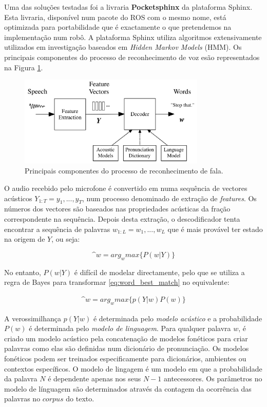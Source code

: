 \documentclass[journal]{IEEEtran}
\begin{document}
Uma das soluções testadas foi a livraria \textbf{Pocketsphinx} da plataforma Sphinx. Esta livraria, disponível num pacote do ROS com o mesmo nome, está optimizada para portabilidade que é exactamente o que pretendemos na implementação num robô. A plataforma Sphinx utiliza algoritmos extensivamente utilizados em investigação baseados em \textit{Hidden Markov Models} (HMM). Os principais componentes do processo de reconhecimento de voz esão representados na Figura \ref{fig:voicerecprocess}.

\begin{figure}[ht]
  \centering
  \includegraphics[width=21pc]{voice_rec_process.png}
  \caption{Principais componentes do processo de reconhecimento de fala.}
  \label{fig:voicerecprocess}
\end{figure}

O audio recebido pelo microfone é convertido em numa sequência de vectores acústicos $Y_{1:T}=y_1,...,y_T$, num processo denominado de extração de \textit{features}. Os números dos vectores são baseados nas propriedades acústicas da fração correspondente na sequência. Depois desta extração, o descodificador tenta encontrar a sequência de palavras $w_{1:L}=w_1,...,w_L$ que é mais provável ter estado na origem de $Y$, ou seja:

\begin{equation}
  \^{w}=arg_w max \{ P(w|Y) \}
\label{eq:word_best_match}
\end{equation}

No entanto, $P(w|Y)$ é difícil de modelar directamente, pelo que se utiliza a regra de Bayes para transformar \ref{eq:word_best_match} no equivalente:

\begin{eqnarray}
  \label{eq:word_bm_equi}
   \^{w} = arg_w max \{ p(Y|w) P(w) \}
\end{eqnarray}

A verossimilhança $p(Y|w)$ é determinada pelo \emph{modelo acústico} e a probabilidade $P(w)$ é determinada pelo \emph{modelo de linguagem}. Para qualquer palavra $w$, é criado um modelo acústico pela concatenação de modelos fonéticos para criar palavras como elas são definidas num dicionário de pronunciação. Os modelos fonéticos podem ser treinados especificamente para dicionários, ambientes ou contextos específicos. O modelo de lingagem é um modelo em que a probabilidade da palavra $N$ é dependente apenas nos seus $N-1$ antecessores. Os parâmetros no modelo de línguagem são determinados através da contagem da ocorrência das palavras no $corpus$ do texto.
\end{document}
